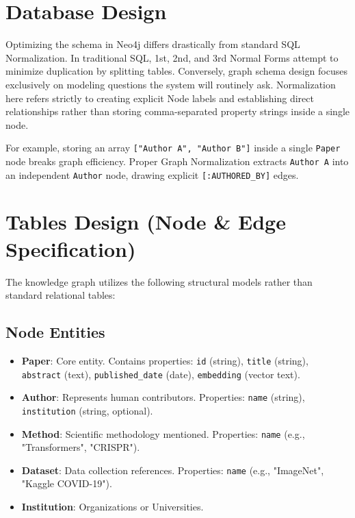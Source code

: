 \documentclass[12pt,a4paper]{report}
\begin{document}
\section{Database Design}

Optimizing the schema in Neo4j differs drastically from standard SQL Normalization. In traditional SQL, 1st, 2nd, and 3rd Normal Forms attempt to minimize duplication by splitting tables. Conversely, graph schema design focuses exclusively on modeling questions the system will routinely ask. Normalization here refers strictly to creating explicit Node labels and establishing direct relationships rather than storing comma-separated property strings inside a single node.

For example, storing an array \texttt{["Author A", "Author B"]} inside a single \texttt{Paper} node breaks graph efficiency. Proper Graph Normalization extracts \texttt{Author A} into an independent \texttt{Author} node, drawing explicit \texttt{[:AUTHORED\_BY]} edges.

\section{Tables Design (Node \& Edge Specification)}

The knowledge graph utilizes the following structural models rather than standard relational tables:

\subsection{Node Entities}
\begin{itemize}
    \item \textbf{Paper}: Core entity. Contains properties: \texttt{id} (string), \texttt{title} (string), \texttt{abstract} (text), \texttt{published\_date} (date), \texttt{embedding} (vector text).
    \item \textbf{Author}: Represents human contributors. Properties: \texttt{name} (string), \texttt{institution} (string, optional).
    \item \textbf{Method}: Scientific methodology mentioned. Properties: \texttt{name} (e.g., "Transformers", "CRISPR").
    \item \textbf{Dataset}: Data collection references. Properties: \texttt{name} (e.g., "ImageNet", "Kaggle COVID-19").
    \item \textbf{Institution}: Organizations or Universities.
\end{itemize}
\end{document}
